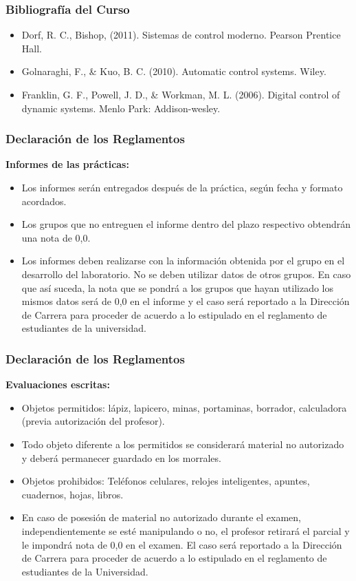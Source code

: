 \documentclass[aspectratio=169]{beamer}
\theoremstyle{definition}
\theoremstyle{plain}
\theoremstyle{remark}
\begin{document}
\begin{frame}[c]\frametitle{Bibliografía del Curso}
\begin{itemize}
  \item Dorf, R. C., Bishop, (2011). Sistemas de control moderno. Pearson Prentice Hall.
  \item Golnaraghi, F., \& Kuo, B. C. (2010). Automatic control systems. Wiley.
  \item Franklin, G. F., Powell, J. D., \& Workman, M. L. (2006). Digital control of dynamic systems. Menlo Park: Addison-wesley.
\end{itemize}
\end{frame}

\begin{frame}[<+->][c]\frametitle{Declaración de los Reglamentos}
\textbf{Informes de las prácticas:}
\begin{itemize}
  \item Los informes serán entregados después de la práctica, según fecha y formato acordados.
  \item Los grupos que no entreguen el informe dentro del plazo respectivo obtendrán una nota de 0,0.
  \item Los informes deben realizarse con la información obtenida por el grupo en el desarrollo del laboratorio. No se deben utilizar datos de otros grupos. En caso que así suceda, la nota que se pondrá a los grupos que hayan utilizado los mismos datos será de 0,0 en el informe y el caso será reportado a la Dirección de Carrera para proceder de acuerdo a lo estipulado en el reglamento de estudiantes de la universidad.
\end{itemize}
\end{frame}

\begin{frame}[<+->][c]\frametitle{Declaración de los Reglamentos}
\textbf{Evaluaciones escritas:}
\begin{itemize}
  \item Objetos permitidos: lápiz, lapicero, minas, portaminas, borrador, calculadora (previa autorización del profesor).
  \item Todo objeto diferente a los permitidos se considerará material no autorizado y deberá permanecer guardado en los morrales.
  \item Objetos prohibidos: Teléfonos celulares, relojes inteligentes, apuntes, cuadernos, hojas, libros.
  \item En caso de posesión de material no autorizado durante el examen, independientemente se esté manipulando o no, el profesor retirará el parcial y le impondrá nota de 0,0 en el examen. El caso será reportado a la Dirección de Carrera para proceder de acuerdo a lo estipulado en el reglamento de estudiantes de la Universidad.
\end{itemize}
\end{frame}
\end{document}
